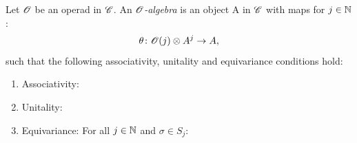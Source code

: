     \begin{defin}
        Let $\mathscr{O}$ be an operad in $\mathscr{C}$. An $\mathscr{O}${\em -algebra} is an object A in
        $\mathscr{C}$ with maps for $j \in \mathbb{N}$:
        \[
            \theta \colon \mathscr{O}(j) \otimes A^j \rightarrow A,
        \]
        such that the following associativity, unitality and equivariance
        conditions hold:
        \begin{enumerate}
            \item Associativity:
                \begin{center}
                \end{center}
            \item Unitality:
                \begin{center}
                \end{center}
            \item Equivariance: For all $j \in \mathbb{N}$ and $\sigma \in S_j$:
                \begin{center}
                \end{center} 
        \end{enumerate}
    \end{defin}

